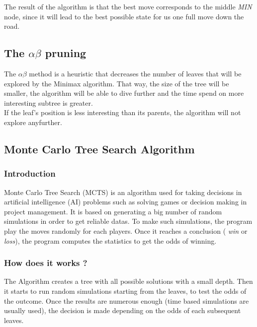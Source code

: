 The result of the algorithm is that the best move corresponds to the middle  \textit{MIN} node, since it will lead to the best possible state for us one full move down the road.

\subsection{The \ensuremath{\alpha\beta} pruning} %
The \ensuremath{\alpha\beta} method is a heuristic that decreases the number of leaves that will be explored by the Minimax algorithm. That way, the size of the tree will be smaller, the algorithm will be able to dive further and the time spend on more interesting subtree is greater.\\
If the leaf's position is less interesting than its parents, the algorithm will not explore anyfurther.

\subsection{Monte Carlo Tree Search Algorithm}
\subsubsection{Introduction}
Monte Carlo Tree Search (MCTS) is an algorithm used for taking decisions in artificial intelligence (AI) problems such as solving games or decision making in project management. It is based on generating a big number of random simulations in order to get reliable datas. To make such simulations, the program play the moves randomly for each players. Once it reaches a conclusion ( \textit{win} or  \textit{loss}), the program computes the statistics to get the odds of winning.
\subsubsection{How does it works ?}
The Algorithm creates a tree with all possible solutions with a small depth.
Then it starts to run random simulations starting from the leaves, to test the odds of the outcome.
Once the results are numerous enough (time based simulations are usually used), the decision is made depending on the odds of each subsequent leaves.

